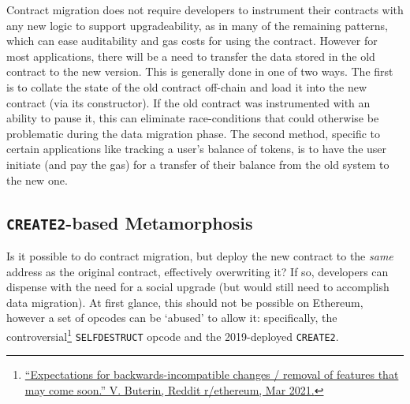 Contract migration does not require developers to instrument their contracts with any new logic to support upgradeability, as in many of the remaining patterns, which can ease auditability and gas costs for using the contract. However for most applications, there will be a need to transfer the data stored in the old contract to the new version. This is generally done in one of two ways. The first is to collate the state of the old contract off-chain and load it into the new contract (\eg via its constructor). If the old contract was instrumented with an ability to pause it, this can eliminate race-conditions that could otherwise be problematic during the data migration phase. The second method, specific to certain applications like tracking a user's balance of tokens, is to have the user initiate (and pay the gas) for a transfer of their balance from the old system to the new one.
 
 

\subsection{\texttt{CREATE2}-based Metamorphosis}
\label{sec:metamorphic}

Is it possible to do contract migration, but deploy the new contract to the \textit{same} address as the original contract, effectively overwriting it? If so, developers can dispense with the need for a social upgrade (but would still need to accomplish data migration). At first glance, this should not be possible on Ethereum, however a set of opcodes can be `abused' to allow it: specifically, the controversial\footnote{\href{https://www.reddit.com/r/ethereum/comments/lx32kv/expectations\_for\_backwardsincompatible\_changes/}{``Expectations for backwards-incompatible changes / removal of features that may come soon.'' V. Buterin, Reddit r/ethereum, Mar 2021.}} \texttt{SELFDESTRUCT} opcode and the 2019-deployed \texttt{CREATE2}. 

